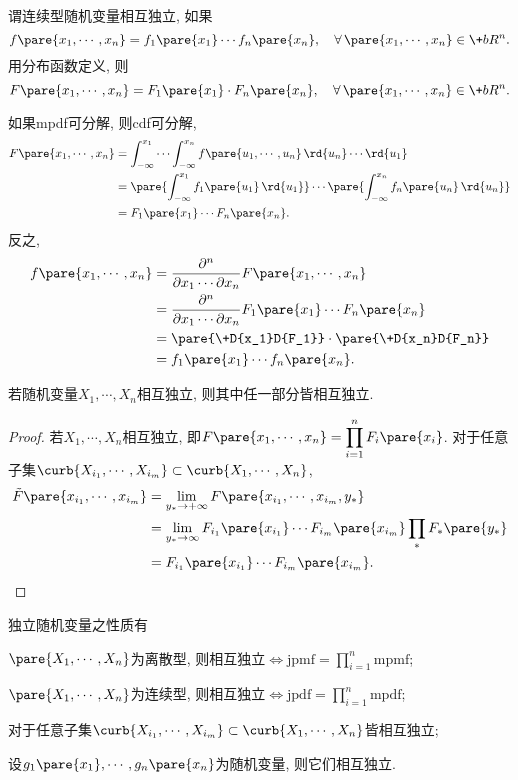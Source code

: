 \documentclass[../Statistics.tex]{subfiles}
\begin{document}
\begin{definition}
    谓连续型随机变量相互独立, 如果
    \[ f\pare{x_1,\cdots, x_n} = f_1\pare{x_1}\cdots f_n\pare{x_n},\quad \forall\,\pare{x_1,\cdots,x_n}\in\+bR^n. \]
    用分布函数定义, 则
    \[ F\pare{x_1,\cdots, x_n} = F_1\pare{x_1}\cdot F_n\pare{x_n},\quad \forall\,\pare{x_1,\cdots,x_n}\in\+bR^n. \]
\end{definition}
如果mpdf可分解, 则cdf可分解,
\begin{align}
    F\pare{x_1,\cdots,x_n} &= \int_{-\infty}^{x_1}\cdots \int_{-\infty}^{x_n} f\pare{u_1,\cdots,u_n}\, \rd{u_n}\cdots \rd{u_1} \\
    &= \pare{\int_{-\infty}^{x_1}f_1\pare{u_1}\,\rd{u_1}} \cdots \pare{\int_{-\infty}^{x_n}f_n\pare{u_n}\,\rd{u_n}} \\
    &= F_1\pare{x_1}\cdots F_n\pare{x_n}.
\end{align}
反之,
\begin{align*}
    f\pare{x_1,\cdots, x_n} &= \frac{\partial^n}{\partial x_1 \cdots \partial x_n} F\pare{x_1,\cdots, x_n} \\
    &= \frac{\partial^n}{\partial x_1 \cdots \partial x_n} F_1\pare{x_1}\cdots F_n\pare{x_n}\\
    &= \pare{\+D{x_1}D{F_1}} \cdot \pare{\+D{x_n}D{F_n}} \\
    &= f_1\pare{x_1}\cdots f_n\pare{x_n}.
\end{align*}
\begin{sample}
    \begin{ex}
        若随机变量$X_1,\cdots, X_n$相互独立, 则其中任一部分皆相互独立.
    \end{ex}
    \begin{proof}
        若$X_1,\cdots,X_n$相互独立, 即$F\pare{x_1,\cdots, x_n} = \displaystyle \prod_{i=1}^n F_i\pare{x_i}$. 对于任意子集$\curb{X_{i_1},\cdots, X_{i_m}}\subset \curb{X_1,\cdots,X_n}$,
        \begin{align*}
            \tilde{F}\pare{x_{i_1},\cdots,x_{i_m}} &= \lim_{y_*\rightarrow +\infty} F\pare{x_{i_1},\cdots, x_{i_m},y_*} \\
            &= \lim_{y_*\rightarrow \infty} F_{i_1}\pare{x_{i_1}}\cdots F_{i_m}\pare{x_{i_m}} \prod_* F_*\pare{y_*} \\
            &= F_{i_1}\pare{x_{i_1}}\cdots F_{i_m}\pare{x_{i_m}}. \qedhere
        \end{align*}
    \end{proof}
\end{sample}
独立随机变量之性质有
\begin{cenum}
    \item $\pare{X_1,\cdots,X_n}$为离散型, 则相互独立$\Leftrightarrow \mathrm{jpmf} = \displaystyle \prod_{i=1}^n \mathrm{mpmf}$;
    \item $\pare{X_1,\cdots,X_n}$为连续型, 则相互独立$\Leftrightarrow \mathrm{jpdf} = \displaystyle \prod_{i=1}^n \mathrm{mpdf}$;
    \item 对于任意子集$\curb{X_{i_1},\cdots, X_{i_m}}\subset \curb{X_1,\cdots,X_n}$皆相互独立;
    \item 设$g_1\pare{x_1},\cdots,g_n\pare{x_n}$为随机变量, 则它们相互独立.
\end{cenum}
\end{document}
